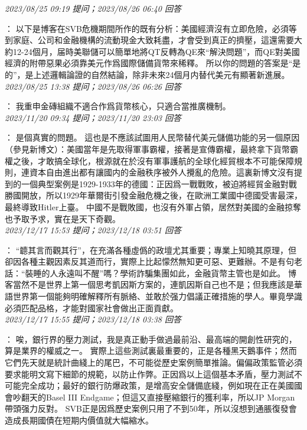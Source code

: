 \documentclass[twocolumn]{ctexart}
\begin{document}
\textit{\hfill\noindent\small 2023/08/25 09:19 提问；2023/08/26 06:40 回答}

：
以下是博客在SVB危機期間所作的既有分析：美國經濟沒有立即危險，必須等到家庭、公司和金融機構的流動現金大致耗盡，才會受到真正的擠壓，這還需要大約12-24個月，届時美聯儲可以簡單地將QT反轉為QE來“解決問題”，而QE對美國經濟的附帶惡果必須靠美元作爲國際儲備貨幣來稀釋。
所以你的問題的答案是“是的”，是上述邏輯論證的自然結論，除非未來24個月内替代美元有顯著新進展。
\\

\textit{\hfill\noindent\small 2023/08/25 13:38 提问；2023/08/26 06:26 回答}

：
我重申金磚組織不適合作爲貨幣核心，只適合當推廣機制。
\\

\textit{\hfill\noindent\small 2023/11/20 09:34 提问；2023/11/20 23:03 回答}

：
是個真實的問題。
這也是不應該試圖用人民幣替代美元儲備功能的另一個原因（參見新博文）：美國當年是先取得軍事霸權，接著是宣傳霸權，最終拿下貨幣霸權之後，才敢搞全球化，根源就在於沒有軍事護航的全球化經貿根本不可能保障規則，連資本自由進出都有讓國内的金融秩序被外人攪亂的危險。這裏新博文沒有提到的一個典型案例是1929-1933年的德國：正因爲一戰戰敗，被迫將經貿金融對戰勝國開放，所以1929年華爾街引發金融危機之後，在歐洲工業國中德國受害最深，最終導致Hitler上臺。
中國不是戰敗國，也沒有外軍占領，居然對美國的金融掠奪也予取予求，實在是天下奇觀。
\\

\textit{\hfill\noindent\small 2023/12/17 15:53 提问；2023/12/18 03:51 回答}

：
“聼其言而觀其行”，在充滿各種虛僞的政壇尤其重要；專業上知曉其原理，但卻因各種主觀因素反其道而行，實際上比起懞然無知更可惡、更難辦。不是有句老話：“裝睡的人永遠叫不醒”嗎？學術詐騙集團如此，金融貨幣主管也是如此。
博客當然不是世界上第一個思考凱因斯方案的，連凱因斯自己也不是；但我應該是華語世界第一個能夠明確解釋所有脈絡、並敢於强力倡議正確措施的學人。畢竟學識必須匹配品格，才能對國家社會做出正面貢獻。
\\

\textit{\hfill\noindent\small 2023/12/17 15:55 提问；2023/12/18 03:38 回答}

：
唉，銀行界的壓力測試，我是真正動手做過最前沿、最高端的開創性研究的，算是業界的權威之一。
實際上這些測試裏最重要的，正是各種黑天鵝事件；然而它們先天就是統計曲綫上的尾巴，不可能從歷史案例簡單推論。偏偏政策監管必須要求能明文寫下細節的規範，以防止作弊。正因爲以上這個基本矛盾，壓力測試不可能完全成功；最好的銀行防爆政策，是增高安全儲備底綫，例如現在正在美國國會吵翻天的Basel III Endgame；但這又直接壓縮銀行的獲利率，所以JP Morgan帶頭强力反對。
SVB正是因爲歷史案例只用了不到50年，所以沒想到通脹復發會造成長期國債在短期内價值就大幅縮水。
\\
\end{document}
